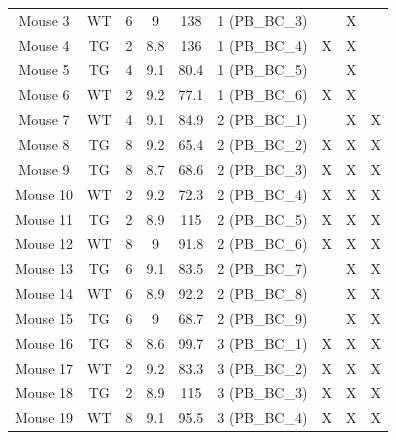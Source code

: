 \begin{landscape}
\begin{table}[]
{\begin{threeparttable}
\begin{tabular}{@{}ccccccccc@{}}
	Mouse 3    & WT  & 6  & 9    & 138      & 1 (PB\_BC\_3)  &                  & X              &                      \\
	Mouse 4    & TG  & 2  & 8.8  & 136      & 1 (PB\_BC\_4)  & X                & X              &                      \\
	Mouse 5    & TG  & 4  & 9.1  & 80.4     & 1 (PB\_BC\_5)  &                  & X              &                      \\
	Mouse 6    & WT  & 2  & 9.2  & 77.1     & 1 (PB\_BC\_6)  & X                & X              &                      \\
	Mouse 7    & WT  & 4  & 9.1  & 84.9     & 2 (PB\_BC\_1)  &                  & X              & X                    \\
	Mouse 8    & TG  & 8  & 9.2  & 65.4     & 2 (PB\_BC\_2)  & X                & X              & X                    \\
	Mouse 9    & TG  & 8  & 8.7  & 68.6     & 2 (PB\_BC\_3)  & X                & X              & X                    \\
	Mouse 10   & WT  & 2  & 9.2  & 72.3     & 2 (PB\_BC\_4)  & X                & X              & X                    \\
	Mouse 11   & TG  & 2  & 8.9  & 115      & 2 (PB\_BC\_5)  & X                & X              & X                    \\
	Mouse 12   & WT  & 8  & 9    & 91.8     & 2 (PB\_BC\_6)  & X                & X              & X                    \\
	Mouse 13   & TG  & 6  & 9.1  & 83.5     & 2 (PB\_BC\_7)  &                  & X              & X                    \\
	Mouse 14   & WT  & 6  & 8.9  & 92.2     & 2 (PB\_BC\_8)  &                  & X              & X                    \\
	Mouse 15   & TG  & 6  & 9    & 68.7     & 2 (PB\_BC\_9)  &                  & X              & X                    \\
	Mouse 16   & TG  & 8  & 8.6  & 99.7     & 3 (PB\_BC\_1)  & X                & X              & X                    \\
	Mouse 17   & WT  & 2  & 9.2  & 83.3     & 3 (PB\_BC\_2)  & X                & X              & X                    \\
	Mouse 18   & TG  & 2  & 8.9  & 115      & 3 (PB\_BC\_3)  & X                & X              & X                    \\
	Mouse 19   & WT  & 8  & 9.1  & 95.5     & 3 (PB\_BC\_4)  & X                & X              & X                    \\

\end{tabular}
\end{threeparttable}}
\end{table}
\end{landscape}
